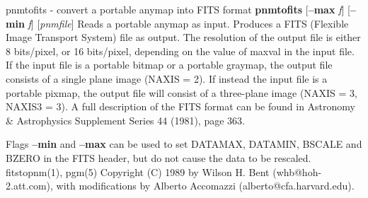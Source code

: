\newpage
%
pnmtofits - convert a portable anymap into FITS format
{\bf pnmtofits}
{\rm [}{\bf --max}
{\it f}{\rm ]}
{\rm [}{\bf --min}
{\it f}{\rm ]}
{\rm [}{\it pnmfile}{\rm ]}
Reads a portable anymap as input.
Produces a FITS (Flexible Image Transport System) file as output.
The resolution of the output file is either 8 bits/pixel,
or 16 bits/pixel, depending on the value of maxval in the input file.
If the input file is a portable bitmap or a portable graymap, the output file
consists of a single plane image (NAXIS = 2). If instead the input file is
a portable pixmap, the output file will consist of a three-plane image
(NAXIS = 3, NAXIS3 = 3).
A full description of the FITS format
can be found in Astronomy \& Astrophysics Supplement Series 44 (1981), page 363.
\par
Flags 
{\bf --min}
and 
{\bf --max}
can be used to set DATAMAX, DATAMIN, BSCALE and BZERO in the FITS
header, but do not cause the data to be rescaled.
fitstopnm(1), pgm(5)
Copyright (C) 1989 by Wilson H. Bent (whb@hoh-2.att.com), with
modifications
by Alberto Accomazzi (alberto@cfa.harvard.edu).
%

%

\newpage
%


